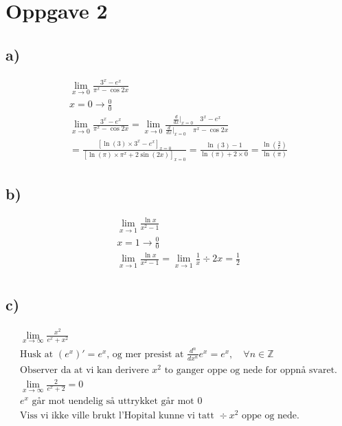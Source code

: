 \documentclass[12pt]{article}
\begin{document}
\break
\section*{Oppgave 2}
\subsection*{a)}
\begin{gather*}
  \lim_{x\to0} \frac{3^x-e^x}{\pi^x-\cos{2x}} \\ 
  x = 0 \rightarrow \frac{0}{0} \\ 
  \lim_{x\to0} \frac{3^x-e^x}{\pi^x-\cos{2x}}
  = \lim_{x\to0}\frac{\frac{d}{dx}|_{x=0} \quad 3^x - e^x}
  {\frac{d}{dx}|_{x=0} \quad \pi^x - \cos{2x}}
  \\ 
  = \frac{[\ln(3) \times 3^x - e^x]_{x=0}}{[\ln(\pi) \times \pi^x + 2\sin(2x)]_{x=0}}
  = \frac{\ln(3) - 1}{\ln(\pi) + 2 \times 0} 
  = \boxed{\frac{\ln(\frac{3}{e})}{\ln(\pi)}}
\end{gather*}

\subsection*{b)}
\begin{gather*}
  \lim_{x\to1} \frac{\ln x}{x^2-1} \\ 
  x = 1 \rightarrow \frac{0}{0} \\ 
  \lim_{x\to1} \frac{\ln x}{x^2-1} = \lim_{x\to1} \frac{1}{x} \div 2x 
  = \boxed{\frac{1}{2}} \\ 
\end{gather*}

\subsection*{c)}
\begin{gather*}
  \lim_{x\to\infty } \frac{x^2}{e^x+x^2} \\ 
  \text{Husk at } (e^x)' = e^x \text{, og mer presist at } 
  \frac{d^n}{dx^n} e^x = e^x, \quad \forall n \in \mathbb Z \\ 
  \text{Observer da at vi kan derivere } x^2 
  \text{ to ganger oppe og nede for oppnå svaret.} \\
  \lim_{x\to\infty}\frac{2}{e^x+2} = \boxed{0} \\ 
  e^x \text{ går mot uendelig så uttrykket går mot 0} \\
  \text{Viss vi ikke ville brukt l'Hopital kunne vi tatt } \div x^2 \text{ oppe og nede.}
\end{gather*}
\end{document}
